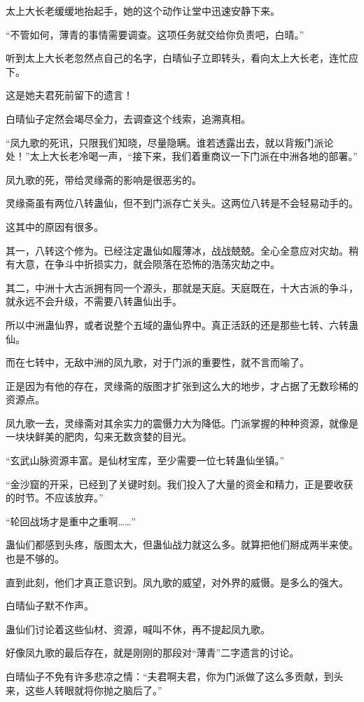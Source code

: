 \begin{this_body}
太上大长老缓缓地抬起手，她的这个动作让堂中迅速安静下来。

“不管如何，薄青的事情需要调查。这项任务就交给你负责吧，白晴。”

听到太上大长老忽然点自己的名字，白晴仙子立即转头，看向太上大长老，连忙应下。

这是她夫君死前留下的遗言！

白晴仙子定然会竭尽全力，去调查这个线索，追溯真相。

“凤九歌的死讯，只限我们知晓，尽量隐瞒。谁若透露出去，就以背叛门派论处！”太上大长老冷喝一声，“接下来，我们着重商议一下门派在中洲各地的部署。”

凤九歌的死，带给灵缘斋的影响是很恶劣的。

灵缘斋虽有两位八转蛊仙，但不到门派存亡关头。这两位八转是不会轻易动手的。

这其中的原因有很多。

其一，八转这个修为。已经注定蛊仙如履薄冰，战战兢兢。全心全意应对灾劫。稍有大意，在争斗中折损实力，就会陨落在恐怖的浩荡灾劫之中。

其二，中洲十大古派拥有同一个源头，那就是天庭。天庭既在，十大古派的争斗，就永远不会升级，不需要八转蛊仙出手。

所以中洲蛊仙界，或者说整个五域的蛊仙界中。真正活跃的还是那些七转、六转蛊仙。

而在七转中，无敌中洲的凤九歌，对于门派的重要性，就不言而喻了。

正是因为有他的存在，灵缘斋的版图才扩张到这么大的地步，才占据了无数珍稀的资源点。

凤九歌一去，灵缘斋对其余实力的震慑力大为降低。门派掌握的种种资源，就像是一块块鲜美的肥肉，勾来无数贪婪的目光。

“玄武山脉资源丰富。是仙材宝库，至少需要一位七转蛊仙坐镇。”

“金沙窟的开采，已经到了关键时刻。我们投入了大量的资金和精力，正是要收获的时节。不应该放弃。”

“轮回战场才是重中之重啊……”

蛊仙们都感到头疼，版图太大，但蛊仙战力就这么多。就算把他们掰成两半来使。也是不够的。

直到此刻，他们才真正意识到。凤九歌的威望，对外界的威慑。是多么的强大。

白晴仙子默不作声。

蛊仙们讨论着这些仙材、资源，喊叫不休，再不提起凤九歌。

好像凤九歌的最后存在，就是刚刚的那段对“薄青”二字遗言的讨论。

白晴仙子不免有许多悲凉之情：“夫君啊夫君，你为门派做了这么多贡献，到头来，这些人转眼就将你抛之脑后了。”


\end{this_body}
